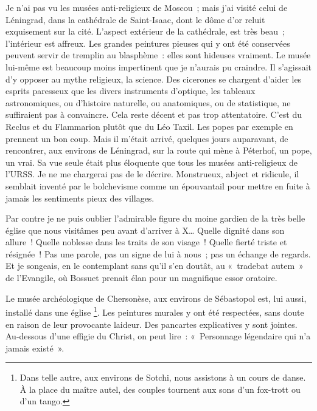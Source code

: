 \documentclass[twoside]{book} %
\newcommand{\astermono}{\medskip\centerline{\color{rubric}\large\selectfont{\syms ✻}}\medskip\par}%
\begin{document}
\noindent Je n’ai pas vu les musées anti-religieux de Moscou ; mais j’ai visité celui de Léningrad, dans la cathédrale de Saint-Isaac, dont le dôme d’or reluit exquisement sur la cité. L’aspect extérieur de la cathédrale, est très beau ; l’intérieur est affreux. Les grandes peintures pieuses qui y ont été conservées peuvent servir de tremplin au blasphème : elles sont hideuses vraiment. Le musée lui-même est beaucoup moins impertinent que je n’aurais pu craindre. Il s’agissait d’y opposer au mythe religieux, la science. Des cicerones se chargent d’aider les esprits paresseux que les divers instruments d’optique, les tableaux astronomiques, ou d’histoire naturelle, ou anatomiques, ou de statistique, ne suffiraient pas à convaincre. Cela reste décent et pas trop attentatoire. C’est du Reclus et du Flammarion plutôt que du Léo Taxil. Les popes par exemple en prennent un bon coup. Mais il m’était arrivé, quelques jours auparavant, de rencontrer, aux environs de Léningrad, sur la route qui mène à Péterhof, un pope, un vrai. Sa vue seule était plus éloquente que tous les musées anti-religieux de l’URSS. Je ne me chargerai pas de le décrire. Monstrueux, abject et ridicule, il semblait inventé par le bolchevisme comme un épouvantail pour mettre en fuite à jamais les sentiments pieux des villages.\par
Par contre je ne puis oublier l’admirable figure du moine gardien de la très belle église que nous visitâmes peu avant d’arriver à X… Quelle dignité dans son allure ! Quelle noblesse dans les traits de son visage ! Quelle fierté triste et résignée ! Pas une parole, pas un signe de lui à nous ; pas un échange de regards. Et je songeais, en le contemplant sans qu’il s’en doutât, au « tradebat autem » de l’Evangile, où Bossuet prenait élan pour un magnifique essor oratoire.\par
Le musée archéologique de Chersonèse, aux environs de Sébastopol est, lui aussi, installé dans une église \footnote{Dans telle autre, aux environs de Sotchi, nous assistons à un cours de danse. À la place du maître autel, des couples tournent aux sons d’un fox-trott ou d’un tango.}. Les peintures murales y ont été respectées, sans doute en raison de leur provocante laideur. Des pancartes explicatives y sont jointes. Au-dessous d’une effigie du Christ, on peut lire : « Personnage légendaire qui n’a jamais existé ».\par

\astermono
\end{document}

